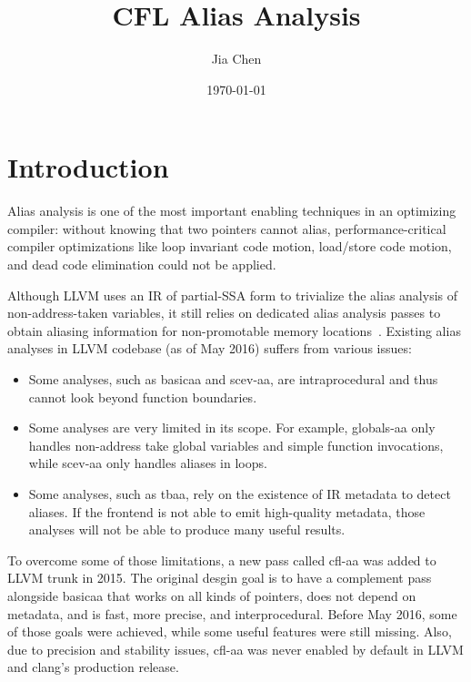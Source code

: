 \documentclass[10pt]{article}
\begin{document}
\title{CFL Alias Analysis}
\author{Jia Chen}
\date{\today}
\maketitle

\section{Introduction}

Alias analysis is one of the most important enabling techniques in an optimizing
compiler: without knowing that two pointers cannot alias, performance-critical
compiler optimizations like loop invariant code motion, load/store code motion,
and dead code elimination could not be applied.

Although LLVM uses an IR of partial-SSA form to trivialize the alias analysis of
non-address-taken variables, it still relies on dedicated alias analysis passes
to obtain aliasing information for non-promotable memory
locations~\cite{LLVMAAPage}. Existing alias analyses in LLVM codebase (as of
May 2016) suffers from various issues:
\begin{itemize}
  \item Some analyses, such as basicaa and scev-aa, are intraprocedural and thus
    cannot look beyond function boundaries.
  \item Some analyses are very limited in its scope. For example, globals-aa
    only handles non-address take global variables and simple function
    invocations, while scev-aa only handles aliases in loops.
  \item Some analyses, such as tbaa, rely on the existence of IR metadata to detect
    aliases. If the frontend is not able to emit high-quality metadata, those
    analyses will not be able to produce many useful results.
\end{itemize}

To overcome some of those limitations, a new pass called cfl-aa was added to
LLVM trunk in 2015. The original desgin goal is to have a complement pass
alongside basicaa that
works on all kinds of pointers, does not depend on metadata, and is fast,
more precise, and interprocedural. Before May 2016, some of those goals were
achieved, while some useful features were still missing. Also, due to precision
and stability issues, cfl-aa was never enabled by default in LLVM and clang's production release.
\end{document}
